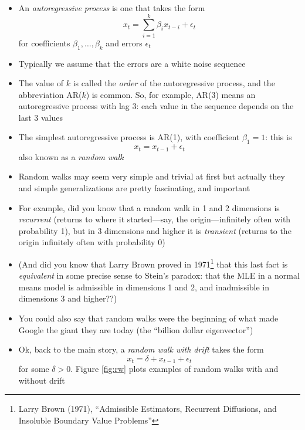 \documentclass{article}
\begin{document}
\begin{itemize}
\item An \emph{autoregressive process} is one that takes the form  
  \[
  x_t = \sum_{i=1}^k \beta_i x_{t-i} + \epsilon_t
  \]
  for coefficients $\beta_1,\dots,\beta_k$ and errors $\epsilon_t$

\item Typically we assume that the errors are a white noise sequence

\item The value of $k$ is called the \emph{order} of the autoregressive process,
  and the abbreviation AR($k$) is common. So, for example, AR(3) means an
  autoregressive process with lag 3: each value in the sequence depends on the  
  last 3 values

\item The simplest autoregressive process is AR(1), with coefficient $\beta_1 =
  1$: this is  
  \[
  x_t = x_{t-1} + \epsilon_t
  \]
  also known as a \emph{random walk}

\item Random walks may seem very simple and trivial at first but actually they
  and simple generalizations are pretty fascinating, and important

\item For example, did you know that a random walk in 1 and 2 dimensions is 
  \emph{recurrent} (returns to where it started---say, the origin---infinitely
  often with probability 1), but in 3 dimensions and higher it is
  \emph{transient} (returns to the origin infinitely often with probability 0) 

\item (And did you know that Larry Brown proved in 1971\footnote{Larry Brown
    (1971), ``Admissible Estimators, Recurrent Diffusions, and Insoluble
    Boundary Value Problems''} 
  that this last fact is \emph{equivalent} in some precise sense to Stein's
  paradox: that the MLE in a normal means model is admissible in dimensions 1
  and 2, and inadmissible in dimensions 3 and higher??)    

\item You could also say that random walks were the beginning of what made
  Google the giant they are today (the ``billion dollar eigenvector'')

\item Ok, back to the main story, a \emph{random walk with drift} takes the form   
  \[
  x_t = \delta + x_{t-1} + \epsilon_t
  \]
  for some $\delta > 0$. Figure \ref{fig:rw} plots examples of random walks with
  and without drift 


\end{itemize}
\end{document}
